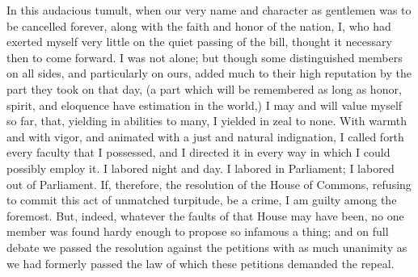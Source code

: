 In this audacious tumult, when our very name and character as gentlemen was to be cancelled forever, along with the faith and honor of the nation, I, who had exerted myself very little on the quiet passing of the bill, thought it necessary then to come forward. I was not alone; but though some distinguished members on all sides, and particularly on ours, added much to their high reputation by the part they took on that day, (a part which will be remembered as long as honor, spirit, and eloquence have estimation in the world,) I may and will value myself so far, that, yielding in abilities to many, I yielded in zeal to none. With warmth and with vigor, and animated with a just and natural indignation, I called forth every faculty that I possessed, and I directed it in every way in which I could possibly employ it. I labored night and day. I labored in Parliament; I labored out of Parliament. If, therefore, the resolution of the House of Commons, refusing to commit this act of unmatched turpitude, be a crime, I am guilty among the foremost. But, indeed, whatever the faults of that House may have been, no one member was found hardy enough to propose so infamous a thing; and on full debate we passed the resolution against the petitions with as much unanimity as we had formerly passed the law of which these petitions demanded the repeal.

